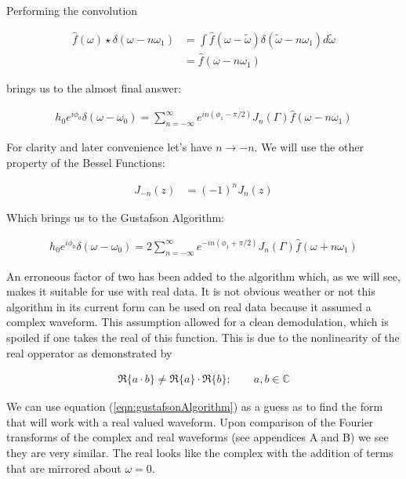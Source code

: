 \documentclass[onecolumn, groupedaddress, 10pt]{revtex4-1}
\begin{document}
Performing the convolution 

\begin{align}
\hat{f}(\omega) \star \delta (\omega - n\omega_1) 
&= \int \hat{f}(\omega - \widetilde{\omega}) \delta(\widetilde{\omega} - n\omega_1) d\widetilde{\omega}			\\
&= \hat{f} (\omega - n\omega_1)
\end{align}

brings us to the almost final answer:

\begin{align}
h_0 e^{i\phi_0} \delta (\omega - \omega_0) = \sum_{n=-\infty}^{\infty} e^{in(\phi_1-\pi/2)} J_n(\Gamma) \hat{f} (\omega - n\omega_1)
\end{align}

For clarity and later convenience let's have $n\to -n$.  We will use the other property of the Bessel Functions: \cite{}

\begin{align}
J_{-n} (z) &= (-1)^n J_n(z)
\end{align}

Which brings us to the Gustafson Algorithm:

\begin{align}
\label{eqn:gustafsonAlgorithm}
\boxed{h_0 e^{i\phi_0} \delta (\omega - \omega_0) = 2 \sum_{n=-\infty}^{\infty} e^{-in(\phi_1+\pi/2)} J_n(\Gamma) \hat{f} (\omega + n\omega_1)}
\end{align}


An erroneous factor of two has been added to the algorithm which, as we will see, makes it suitable for use with real data.  It is not obvious weather or not this algorithm in its current form can be used on real data because it assumed a complex waveform.  This assumption allowed for a clean demodulation, which is spoiled if one takes the real of this function.  This is due to the nonlinearity of the real opperator as demonstrated by

\begin{align}
\Re \{ a \cdot b \} \neq \Re \{ a \} \cdot \Re \{ b \}; \qquad a,b \in \mathds{C}
\end{align}

We can use equation (\ref{eqn:gustafsonAlgorithm}) as a guess as to find the form that will work with a real valued waveform.  Upon comparison of the Fourier transforms of the complex and real waveforms (see appendices A and B) we see they are very similar.  The real looks like the complex with the addition of terms that are mirrored about $\omega=0$.
\end{document}
